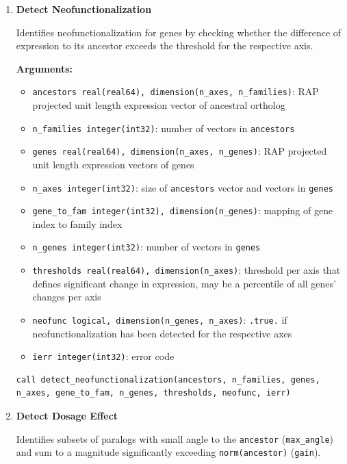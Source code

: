 \begin{enumerate}
    \item \textbf{Detect Neofunctionalization}

        Identifies neofunctionalization for genes by checking whether the difference of expression to its ancestor exceeds the threshold for the respective axis.

        \textbf{Arguments:}
        \begin{itemize}
            \item \lstinline!ancestors real(real64), dimension(n_axes, n_families)!: RAP projected unit length expression vector of ancestral ortholog
            \item \lstinline!n_families integer(int32)!: number of vectors in \lstinline!ancestors!
            \item \lstinline!genes real(real64), dimension(n_axes, n_genes)!: RAP projected unit length expression vectors of genes
            \item \lstinline!n_axes integer(int32)!: size of \lstinline!ancestors! vector and vectors in \lstinline!genes!
            \item \lstinline!gene_to_fam integer(int32), dimension(n_genes)!: mapping of gene index to family index
            \item \lstinline!n_genes integer(int32)!: number of vectors in \lstinline!genes!
            \item \lstinline!thresholds real(real64), dimension(n_axes)!: threshold per axis that defines significant change in expression, may be a percentile of all genes' changes per axis
            \item \lstinline!neofunc logical, dimension(n_genes, n_axes)!: \lstinline!.true.! if neofunctionalization has been detected for the respective axes
            \item \lstinline!ierr integer(int32)!: error code
        \end{itemize}

\begin{lstlisting}[caption={Vector RAP Projection}]
call detect_neofunctionalization(ancestors, n_families, genes, n_axes, gene_to_fam, n_genes, thresholds, neofunc, ierr)
\end{lstlisting}


    \item \textbf{Detect Dosage Effect}

        Identifies subsets of paralogs with small angle to the \lstinline!ancestor! (\lstinline!max_angle!) and sum to a magnitude significantly exceeding \lstinline!norm(ancestor)! (\lstinline!gain!).


\end{enumerate}
